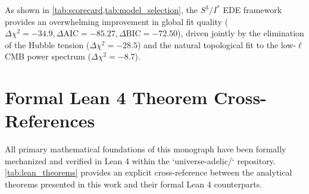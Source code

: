 \documentclass[11pt,a4paper]{article}
\theoremstyle{definition}
\newcommand{\PDS}{S^3 / I^*}
\begin{document}
As shown in \cref{tab:scorecard,tab:model_selection}, the $\PDS$ EDE framework provides an overwhelming improvement in global fit quality ($\Delta \chi^2 = -34.9, \Delta\text{AIC} = -85.27, \Delta\text{BIC} = -72.50$), driven jointly by the elimination of the Hubble tension ($\Delta \chi^2 = -28.5$) and the natural topological fit to the low-$\ell$ CMB power spectrum ($\Delta \chi^2 = -8.7$).

\section{Formal Lean 4 Theorem Cross-References}
\label{sec:lean}

All primary mathematical foundations of this monograph have been formally mechanized and verified in Lean 4 within the `universe-adelic/` repository. \cref{tab:lean_theorems} provides an explicit cross-reference between the analytical theorems presented in this work and their formal Lean 4 counterparts.
\end{document}
